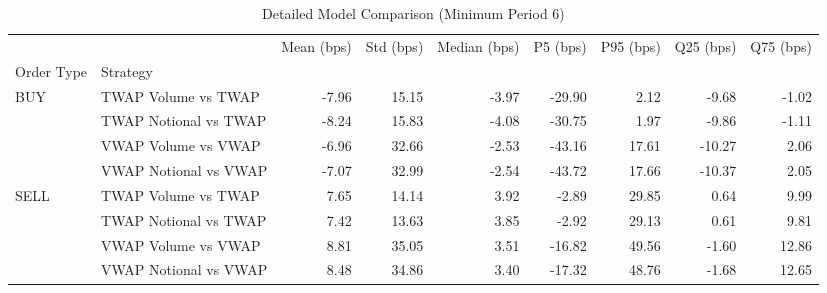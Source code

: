 \begin{table}
\caption{Detailed Model Comparison (Minimum Period 6)}
\label{tab:detailed_min_period_6}
\begin{tabular}{l|l|rrrrrrr}
\toprule
 &  & Mean (bps) & Std (bps) & Median (bps) & P5 (bps) & P95 (bps) & Q25 (bps) & Q75 (bps) \\
Order Type & Strategy &  &  &  &  &  &  &  \\
\midrule
\multirow[t]{4}{*}{BUY} & TWAP Volume vs TWAP & -7.96 & 15.15 & -3.97 & -29.90 & 2.12 & -9.68 & -1.02 \\
 & TWAP Notional vs TWAP & -8.24 & 15.83 & -4.08 & -30.75 & 1.97 & -9.86 & -1.11 \\
 & VWAP Volume vs VWAP & -6.96 & 32.66 & -2.53 & -43.16 & 17.61 & -10.27 & 2.06 \\
 & VWAP Notional vs VWAP & -7.07 & 32.99 & -2.54 & -43.72 & 17.66 & -10.37 & 2.05 \\
\cline{1-9}
\multirow[t]{4}{*}{SELL} & TWAP Volume vs TWAP & 7.65 & 14.14 & 3.92 & -2.89 & 29.85 & 0.64 & 9.99 \\
 & TWAP Notional vs TWAP & 7.42 & 13.63 & 3.85 & -2.92 & 29.13 & 0.61 & 9.81 \\
 & VWAP Volume vs VWAP & 8.81 & 35.05 & 3.51 & -16.82 & 49.56 & -1.60 & 12.86 \\
 & VWAP Notional vs VWAP & 8.48 & 34.86 & 3.40 & -17.32 & 48.76 & -1.68 & 12.65 \\
\cline{1-9}
\bottomrule
\end{tabular}
\end{table}
